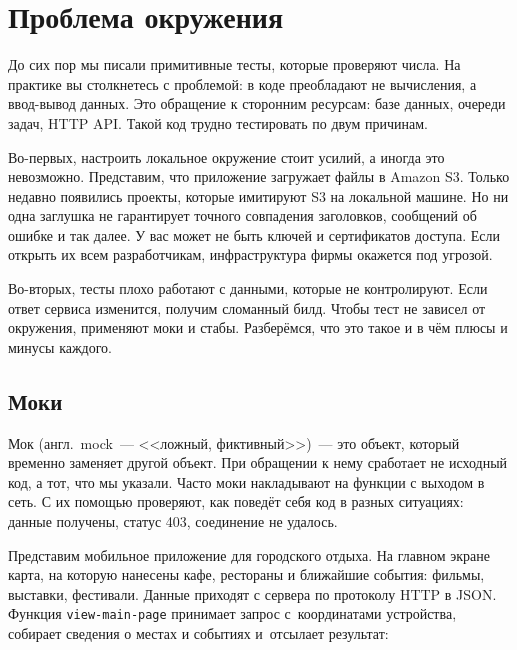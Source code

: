 \section{Проблема окружения}


До сих пор мы писали примитивные тесты, которые проверяют числа. На практике вы
столкнетесь с проблемой: в коде преобладают не вычисления, а ввод-вывод
данных. Это обращение к сторонним ресурсам: базе данных, очереди задач, HTTP
API. Такой код трудно тестировать по двум причинам.


Во-первых, настроить локальное окружение стоит усилий, а иногда это
невозможно. Представим, что приложение загружает файлы в Amazon S3. Только
недавно появились проекты, которые имитируют S3 на локальной машине. Но ни одна
заглушка не гарантирует точного совпадения заголовков, сообщений об ошибке и так
далее. У вас может не быть ключей и сертификатов доступа. Если открыть их всем
разработчикам, инфраструктура фирмы окажется под угрозой.

Во-вторых, тесты плохо работают с данными, которые не контролируют. Если ответ
сервиса изменится, получим сломанный билд. Чтобы тест не зависел от окружения,
применяют моки и стабы. Разберёмся, что это такое и в чём плюсы и минусы
каждого.

\subsection{Моки}

\label{test-isolation}


Мок (англ.~mock~--- <<ложный, фиктивный>>)~--- это объект, который временно
заменяет другой объект. При обращении к нему сработает не исходный код, а тот,
что мы указали. Часто моки накладывают на функции с выходом в сеть. С их помощью
проверяют, как поведёт себя код в разных ситуациях: данные получены, статус 403,
соединение не удалось.

\label{mobile-app-intro}


Представим мобильное приложение для городского отдыха. На главном экране карта,
на которую нанесены кафе, рестораны и ближайшие события: фильмы, выставки,
фестивали. Данные приходят с сервера по протоколу HTTP в JSON. Функция
\verb|view-main-page| принимает запрос с~координатами устройства, собирает
сведения о местах и событиях и~отсылает результат:


